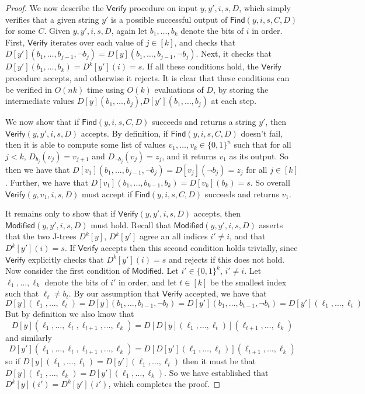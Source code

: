\documentclass[11pt]{article}
\newcommand{\B}{\{0,1\}}
\begin{document}
\begin{proof}
\sloppy We now describe the $\mathsf{Verify}$ procedure on input $y,y',i,s,D$, which simply verifies that a given string $y'$ is a possible successful output of $\mathsf{Find}(y,i,s,C,D)$ for some $C$. Given $y,y',i,s,D$, again let $b_1,\ldots, b_k$ denote the bits of $i$ in order. First, $\mathsf{Verify}$ iterates over each value of $j \in [k]$, and checks that $D[y'](b_1,\ldots,b_{j-1},\lnot b_j) = D[y](b_1,\ldots,b_{j-1},\lnot b_j)$. Next, it checks that $D[y'](b_1,\ldots,b_k) = D^k[y'](i) = s$. If all these conditions hold, the $\mathsf{Verify}$ procedure accepts, and otherwise it rejects. It is clear that these conditions can be verified in $O(nk)$ time using $O(k)$ evaluations of $D$, by storing the intermediate values $D[y](b_1,\ldots,b_j)$,$D[y'](b_1,\ldots,b_j)$ at each step.

We now show that if $\mathsf{Find}(y,i,s,C,D)$ succeeds and returns a string $y'$, then $\mathsf{Verify}(y,y',i,s,D)$ accepts. By definition, if $\mathsf{Find}(y,i,s,C,D)$ doesn't fail, then it is able to compute some list of values $v_1,\ldots,v_k \in \B^n$ such that for all $j < k$, $D_{b_j}(v_j) = v_{j+1}$ and $D_{\lnot b_j}(v_j) = z_j$, and it returns $v_1$ as its output. So then we have that $D[v_1](b_1,\ldots,b_{j-1},\lnot b_j) = D[v_j](\lnot b_j) = z_j$ for all $j \in [k]$. Further, we have that $D[v_1](b_1,\ldots,b_{k-1},b_k) = D[v_k](b_k) = s$. So overall $\mathsf{Verify}(y,v_1,i,s,D)$ must accept if $\mathsf{Find}(y,i,s,C,D)$ succeeds and returns $v_1$.

It remains only to show that if $\mathsf{Verify}(y,y',i,s,D)$ accepts, then $\mathsf{Modified}(y,y',i,s,D)$ must hold. Recall that $\mathsf{Modified}(y,y',i,s,D)$ asserts that the two J-trees $D^k[y]$, $D^k[y']$ agree an all indices $i'\neq i$, and that $D^k[y'](i) = s$. If $\mathsf{Verify}$ accepts then this second condition holds trivially, since $\mathsf{Verify}$ explicitly checks that $D^k[y'](i) = s$ and rejects if this does not hold. Now consider the first condition of $\mathsf{Modified}$. Let $i' \in \B^k$, $i' \neq i$. Let $\ell_1, \ldots, \ell_k$ denote the bits of $i'$ in order, and let $t \in [k]$ be the smallest index such that $\ell_t \neq b_t$. By our assumption that $\mathsf{Verify}$ accepted, we have that 
\[
D[y](\ell_1,\ldots,\ell_t) = D[y](b_1,\ldots,b_{t-1},\lnot b_t) = D[y'](b_1,\ldots,b_{t-1},\lnot b_t) = D[y'](\ell_1,\ldots,\ell_t)
\]
But by definition we also know that
\[
D[y](\ell_1,\ldots,\ell_t,\ell_{t+1},\ldots,\ell_k) = D[D[y](\ell_1,\ldots,\ell_t)](\ell_{t+1},\ldots,\ell_k)
\]
and similarly
\[
D[y'](\ell_1,\ldots,\ell_t,\ell_{t+1},\ldots,\ell_k) = D[D[y'](\ell_1,\ldots,\ell_t)](\ell_{t+1},\ldots,\ell_k)
\]
so if $D[y](\ell_1,\ldots,\ell_t) = D[y'](\ell_1,\ldots,\ell_t)$ then it must be that $D[y](\ell_1,\ldots,\ell_k) = D[y'](\ell_1,\ldots,\ell_k)$. So we have established that $D^k[y](i') = D^k[y'](i')$, which completes the proof.
\end{proof}
\end{document}
